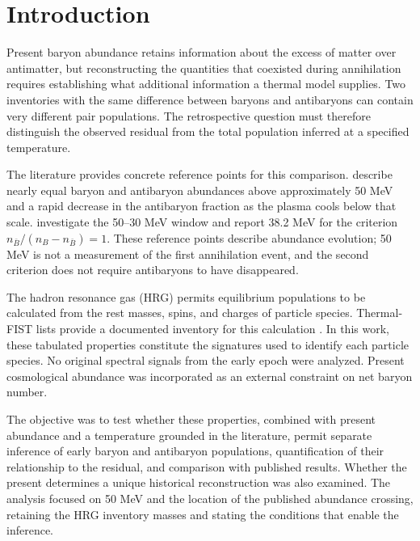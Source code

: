 \section{Introduction}
Present baryon abundance retains information about the excess of matter over antimatter, but reconstructing the quantities that coexisted during annihilation requires establishing what additional information a thermal model supplies. Two inventories with the same difference between baryons and antibaryons can contain very different pair populations. The retrospective question must therefore distinguish the observed residual from the total population inferred at a specified temperature.

The literature provides concrete reference points for this comparison. \citet{Satarov2013} describe nearly equal baryon and antibaryon abundances above approximately 50 MeV and a rapid decrease in the antibaryon fraction as the plasma cools below that scale. \citet{Yang2022} investigate the 50--30 MeV window and report 38.2 MeV for the criterion $n_{\bar B}/(n_B-n_{\bar B})=1$. These reference points describe abundance evolution; 50 MeV is not a measurement of the first annihilation event, and the second criterion does not require antibaryons to have disappeared.

The hadron resonance gas (HRG) permits equilibrium populations to be calculated from the rest masses, spins, and charges of particle species. Thermal-FIST lists provide a documented inventory for this calculation \citep{Vovchenko2019,TFLists2026}. In this work, these tabulated properties constitute the signatures used to identify each particle species. No original spectral signals from the early epoch were analyzed. Present cosmological abundance was incorporated as an external constraint on net baryon number.

The objective was to test whether these properties, combined with present abundance and a temperature grounded in the literature, permit separate inference of early baryon and antibaryon populations, quantification of their relationship to the residual, and comparison with published results. Whether the present determines a unique historical reconstruction was also examined. The analysis focused on 50 MeV and the location of the published abundance crossing, retaining the HRG inventory masses and stating the conditions that enable the inference.
